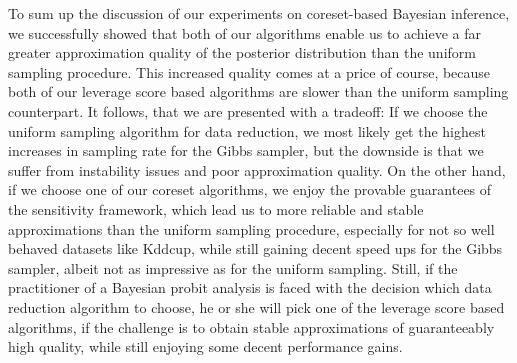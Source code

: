 To sum up the discussion of our experiments on coreset-based Bayesian
inference, we successfully showed that both of our algorithms
enable us to achieve a far greater approximation quality of
the posterior distribution than the uniform sampling procedure.
This increased quality comes at a price of course, because
both of our leverage score based algorithms are slower than
the uniform sampling counterpart.
It follows, that we are presented with a tradeoff:
If we choose the uniform sampling algorithm for data reduction,
we most likely get the highest increases in sampling rate for
the Gibbs sampler, but the downside is that we suffer from
instability issues and poor approximation quality.
On the other hand, if we choose one of our coreset algorithms,
we enjoy the provable guarantees of the sensitivity framework,
which lead us to more reliable and stable approximations than the
uniform sampling procedure, especially for not so well behaved
datasets like Kddcup, while still gaining decent speed ups for
the Gibbs sampler, albeit not as impressive as for the
uniform sampling.
Still, if the practitioner of a Bayesian probit analysis is faced with
the decision which data reduction algorithm to choose, he or she
will pick one of the leverage score based algorithms, if the
challenge is to obtain stable approximations of guaranteeably
high quality, while still enjoying some decent performance gains.
